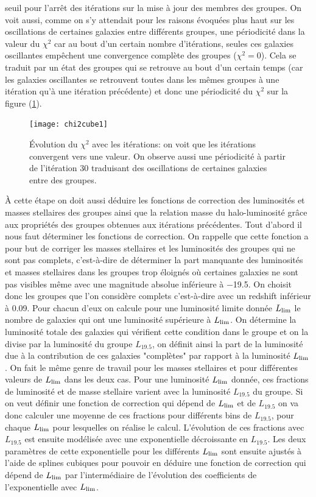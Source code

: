 seuil pour l'arrêt des itérations sur la mise à jour des membres des groupes. On voit aussi, comme on s'y attendait pour les
raisons évoquées plus haut sur les oscillations de certaines galaxies entre différents groupes, une périodicité dans la valeur du
$\chi^2$ car au bout d'un certain nombre d'itérations, seules ces galaxies oscillantes empêchent une convergence complète des
groupes ($\chi^2=0$). Cela se traduit par un état des groupes qui se retrouve au bout d'un certain temps (car les galaxies
oscillantes se retrouvent toutes dans les mêmes groupes à une itération qu'à une itération précédente) et donc une périodicité du
$\chi^2$ sur la figure (\ref{fig:evchi2}).
\begin{figure}[htb]
	\centering
	\texttt{[image: chi2cube1]}
	\caption{\footnotesize{}{\'E}volution du $\chi^2$ avec les itérations: on voit que les itérations convergent vers une
	valeur. On observe aussi une périodicité à partir de l'itération 30 traduisant des oscillations de certaines galaxies entre
	des groupes.}
	\label{fig:evchi2}
\end{figure}

\`A cette étape on doit aussi déduire les fonctions de correction des luminosités et masses stellaires des groupes ainsi que la
relation masse du halo-luminosité grâce aux propriétés des groupes obtenues aux itérations précédentes. Tout d'abord il nous faut
déterminer les fonctions de correction. On rappelle que cette fonction a pour but de corriger les masses stellaires et les
luminosités des groupes qui ne sont pas complets, c'est-à-dire de déterminer la part manquante des luminosités et masses stellaires
dans les groupes trop éloignés où certaines galaxies ne sont pas visibles même avec une magnitude absolue inférieure à \num{-19.5}.
On choisit donc les groupes que l'on considère complets c'est-à-dire avec un redshift inférieur à \num{0,09}. Pour chacun d'eux on
calcule pour une luminosité limite donnée $L_{\rm{lim}}$ le nombre de galaxies qui ont une luminosité supérieure à $L_{\rm{lim}}$.
On détermine la luminosité totale des galaxies qui vérifient cette condition dans le groupe et on la divise par la luminosité du
groupe $L_{\num{19,5}}$, on définit ainsi la part de la luminosité due à la contribution de ces galaxies "complètes" par rapport à
la luminosité $L_{\rm{lim}}$. On fait le même genre de travail pour les masses stellaires et pour différentes valeurs de
$L_{\rm{lim}}$ dans les deux cas. Pour une luminosité $L_{\rm{lim}}$ donnée, ces fractions de luminosité et de masse stellaire
varient avec la luminosité $L_{\num{19,5}}$ du groupe. Si on veut définir une fonction de correction qui dépend de $L_{\rm{lim}}$
et de $L_{\num{19,5}}$ on va donc calculer une moyenne de ces fractions pour différents bins de $L_{\num{19,5}}$, pour chaque
$L_{\rm{lim}}$ pour lesquelles on réalise le calcul. L'évolution de ces fractions avec $L_{\num{19,5}}$ est ensuite modélisée avec
une exponentielle décroissante en $L_{\num{19,5}}$. Les deux paramètres de cette exponentielle pour les différents $L_{\rm{lim}}$
sont ensuite ajustés à l'aide de splines cubiques pour pouvoir en déduire une fonction de correction qui dépend de $L_{\rm{lim}}$
par l'intermédiaire de l'évolution des coefficients de l'exponentielle avec $L_{\rm{lim}}$.

